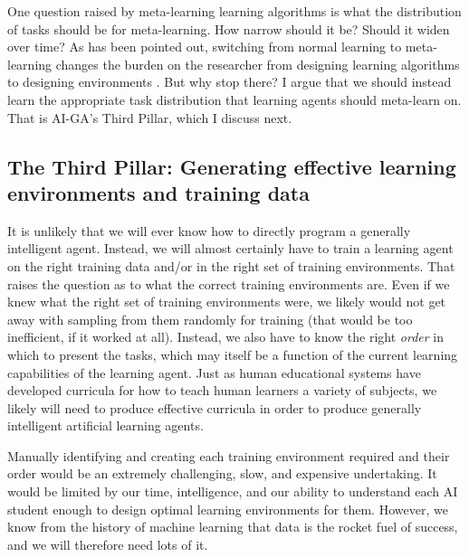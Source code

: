 \documentclass{article}
\begin{document}
One question raised by meta-learning learning algorithms is what the distribution of tasks should be for meta-learning. How narrow should it be? Should it widen over time? As has been pointed out, switching from normal learning to meta-learning changes the burden on the researcher from designing learning algorithms to designing environments \cite{gupta2018unsupervised}. But why stop there? I argue that we should instead learn the appropriate task distribution that learning agents should meta-learn on. That is AI-GA's Third Pillar, which I discuss next.

\subsection{The Third Pillar: Generating effective learning environments and training data}
\label{Pillar3learningEnvs}

It is unlikely that we will ever know how to directly program a generally intelligent agent. Instead, we will almost certainly have to train a learning agent on the right training data and/or in the right set of training environments. That raises the question as to what the correct training environments are. Even if we knew what the right set of training environments were, we likely would not get away with sampling from them randomly for training (that would be too inefficient, if it worked at all). Instead, we also have to know the right \emph{order} in which to present the tasks, which may itself be a function of the current learning capabilities of the learning agent. Just as human educational systems have developed curricula for how to teach human learners a variety of subjects, we likely will need to produce effective curricula in order to produce generally intelligent artificial learning agents. 

Manually identifying and creating each training environment required and their order would be an extremely challenging, slow, and expensive undertaking. It would be limited by our time, intelligence, and our ability to understand each AI student enough to design optimal learning environments for them. However, we know from the history of machine learning that data is the rocket fuel of success, and we will therefore need lots of it. 
\end{document}
